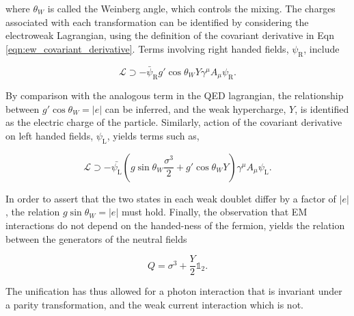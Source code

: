 \noindent where ${\theta_{W}}$ is called the Weinberg angle, which controls the mixing. The charges associated with each transformation can be identified by considering the electroweak Lagrangian, using the definition of the covariant derivative in Eqn \ref{eqn:ew_covariant_derivative}. Terms involving right handed fields, ${\psi_{\mathrm{R}}}$, include

\begin{equation}
    \mathcal{L} \supset -\bar{\psi}_{\mathrm{R}}g'\cos{\theta_{W}}Y\gamma^{\mu}A_{\mu}\psi_{\mathrm{R}}.
\end{equation}


\noindent By comparison with the analogous term in the QED lagrangian, 
the relationship between ${g'\cos{\theta_{W}}=|e|}$ can be inferred, and the weak hypercharge, ${Y}$, is identified as the electric charge of the particle. Similarly, action of the covariant derivative on left handed fields, $\psi_{\mathrm{L}}$, yields terms such as,

\begin{equation}
    \mathcal{L} \supset -\bar{\psi_{\mathrm{L}}}(g\sin{\theta_{W}}\frac{\sigma^{3}}{2} + g'\cos{\theta_{W}}Y)\gamma^{\mu}A_{\mu}\psi_{\mathrm{L}}.
\end{equation}

\noindent In order to assert that the two states in each weak doublet differ by a factor of $|e|$, the relation $g\sin{\theta_{W}}=|e|$ must hold. Finally, the observation that EM interactions do not depend on the handed-ness of the fermion, yields the relation between the generators of the neutral fields

\begin{equation}
    Q = \sigma^{3} + \frac{Y}{2}\mathbb{1}_{2}.
\end{equation}

\noindent The unification has thus allowed for a photon interaction that is invariant under a parity transformation, and the weak current interaction which is not.

